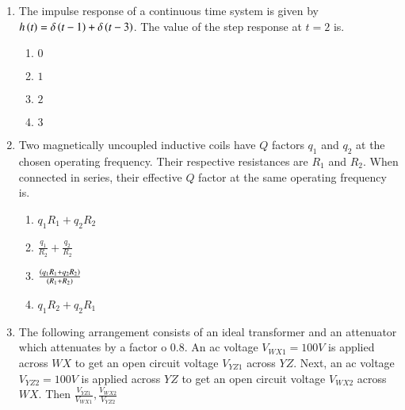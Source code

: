 \documentclass[journal]{IEEEtran}
\begin{document}
\begin{enumerate}
{\begin{figure}[H]
\label{fig:my_label}
\end{figure}
\begin{multicols}{4}
\begin{enumerate}
\item $\frac{s+1}{5s^2+6s+2}$
\item $\frac{s+1}{s^2+6s+2}$
\item $\frac{s+1}{s^2+4s+2}$
\item $\frac{1}{5s^2+6s+2}$
\end{enumerate}
\end{multicols}
}
\item{
The impulse response of a continuous time system is given by $h\left(t\right)=\delta\left(t-1\right)+\delta\left(t-3\right)$. The value of the step response at $t=2$ is.
\begin{multicols}{4}
\begin{enumerate}
\item $0$
\item $1$ 
\item $2$
\item $3$
\end{enumerate}
\end{multicols}}
\item{
Two magnetically uncoupled inductive coils have $Q$ factors $q_1$ and $q_2$ at the chosen operating frequency. Their respective resistances are $R_1$ and $R_2$. When connected in series, their effective $Q$ factor at the same operating frequency is.
\begin{multicols}{4}
\begin{enumerate}
\item $q_1R_1+q_2R_2$
\item $\frac{q_1}{R_2}+\frac{q_2}{R_2}$
\item $\frac{\left(q_1R_1+q_2R_2\right)}{\left(R_1+R_2\right)}$
\item $q_1R_2+q_2R_1$
\end{enumerate}
\end{multicols}
}
\item{
The following arrangement consists of an ideal transformer and an attenuator which attenuates by a factor o $0.8$. An ac voltage $V_{WX1}=100V$ is applied across $WX$ to get an open circuit voltage $V_{YZ1}$ across $YZ$. Next, an ac voltage $V_{YZ2}=100V$ is applied across $YZ$ to get an open circuit voltage $V_{WX2}$ across $WX$. Then $\frac{V_{YZ1}}{V_{WX1}},\frac{V_{WX2}}{V_{YZ2}}$
\begin{figure}[H]
\centering
\resizebox{5cm}{!}{%
\begin{circuitikz}

\end{circuitikz}}
\end{figure}}
\end{enumerate}
\end{document}
